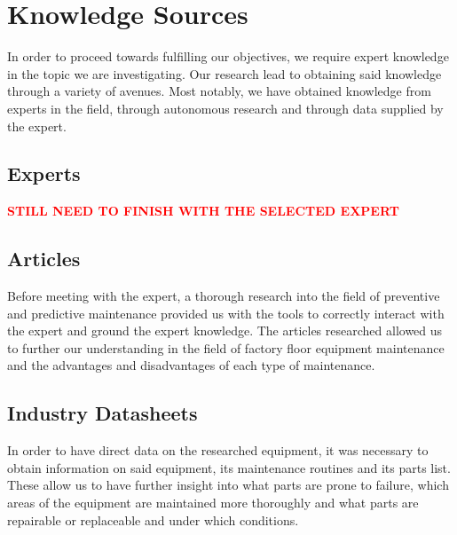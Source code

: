 \section{Knowledge Sources}

In order to proceed towards fulfilling our objectives, we require expert knowledge in the topic we are investigating. Our research lead to obtaining said knowledge through a variety of avenues. Most notably, we have obtained knowledge from experts in the field, through autonomous research and through data supplied by the expert.

\subsection{Experts}

\textcolor{red}{\textbf{STILL NEED TO FINISH WITH THE SELECTED EXPERT}}

\subsection{Articles}

Before meeting with the expert, a thorough research into the field of preventive and predictive maintenance provided us with the tools to correctly interact with the expert and ground the expert knowledge. The articles researched allowed us to further our understanding in the field of factory floor equipment maintenance and the advantages and disadvantages of each type of maintenance.

\subsection{Industry Datasheets}

In order to have direct data on the researched equipment, it was necessary to obtain information on said equipment, its maintenance routines and its parts list. These allow us to have further insight into what parts are prone to failure, which areas of the equipment are maintained more thoroughly and what parts are repairable or replaceable and under which conditions.